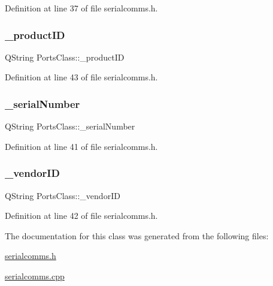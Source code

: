 Definition at line 37 of file serialcomms.\+h.

\mbox{\label{class_ports_class_abee7fa7a0c5b404bb642709d47720b4f}} 
\subsubsection{\texorpdfstring{\_productID}{\_productID}}
{\footnotesize\ttfamily Q\+String Ports\+Class\+::\+\_\+product\+ID\hspace{0.3cm}{\ttfamily [private]}}



Definition at line 43 of file serialcomms.\+h.

\mbox{\label{class_ports_class_a6da92952a206b58a2325cd8d3393c438}} 
\subsubsection{\texorpdfstring{\_serialNumber}{\_serialNumber}}
{\footnotesize\ttfamily Q\+String Ports\+Class\+::\+\_\+serial\+Number\hspace{0.3cm}{\ttfamily [private]}}



Definition at line 41 of file serialcomms.\+h.

\mbox{\label{class_ports_class_ac7fb67486a136f2a0667d2b4b1be403e}} 
\subsubsection{\texorpdfstring{\_vendorID}{\_vendorID}}
{\footnotesize\ttfamily Q\+String Ports\+Class\+::\+\_\+vendor\+ID\hspace{0.3cm}{\ttfamily [private]}}



Definition at line 42 of file serialcomms.\+h.



The documentation for this class was generated from the following files\+:\begin{DoxyCompactItemize}
\item 
\mbox{\hyperlink{serialcomms_8h}{serialcomms.\+h}}\item 
\mbox{\hyperlink{serialcomms_8cpp}{serialcomms.\+cpp}}\end{DoxyCompactItemize}
